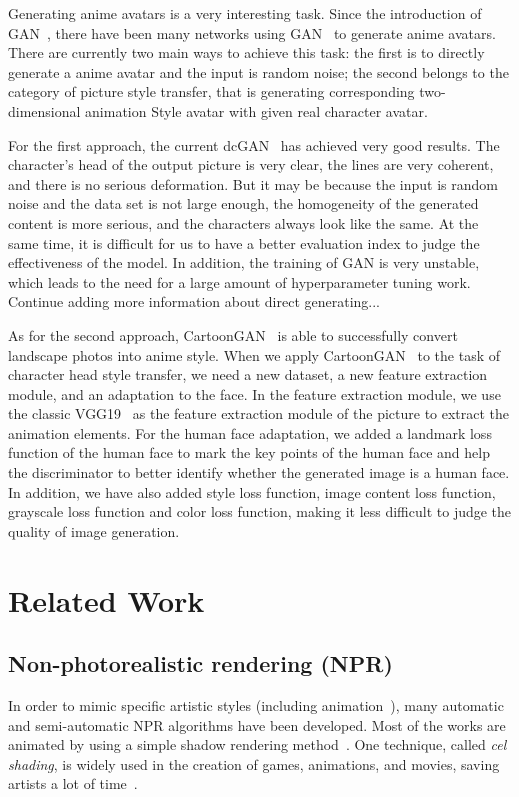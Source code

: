 \documentclass[10pt,twocolumn,letterpaper]{article}
\begin{document}
Generating anime avatars is a very interesting task. Since the introduction of GAN~\cite{GAN},
there have been many networks using GAN~\cite{GAN} to generate anime avatars. There are currently
two main ways to achieve this task: the first is to directly generate a anime avatar
and the input is random noise; the second belongs to the category of picture style
transfer, that is generating corresponding two-dimensional animation Style avatar with given real 
character avatar.

For the first approach, the current dcGAN~\cite{dcGAN} has achieved very good results. 
The character's head of the output picture is very clear, the lines are very coherent, and there 
is no serious deformation. But it may be because the input is random noise and the data 
set is not large enough, the homogeneity of the generated content is more serious, and the 
characters always look like the same. At the same time, it is difficult for us to have a better 
evaluation index to judge the effectiveness of the model. In addition, the training of GAN 
is very unstable, which leads to the need for a large amount of hyperparameter tuning work.
{\color{red}Continue adding more information about direct generating...}

As for the second approach, CartoonGAN~\cite{CartoonGAN} is able to successfully convert landscape photos 
into anime style. When we apply CartoonGAN~\cite{CartoonGAN} to the task of character head style transfer, 
we need a new dataset, a new feature extraction module, and an adaptation to the face. 
In the feature extraction module, we use the classic VGG19~\cite{VGG} as the feature extraction 
module of the picture to extract the animation elements. For the human face adaptation, 
we added a landmark loss function of the human face to mark the key points of the human face and 
help the discriminator to better identify whether the generated image is a human face. In addition, 
we have also added style loss function, image content loss function, 
grayscale loss function and color loss function, making it less difficult to 
judge the quality of image generation.

\section{Related Work}

\subsection{Non-photorealistic rendering (NPR)}
In order to mimic specific artistic styles (including animation~\cite{rosin2012image}), many automatic and 
semi-automatic NPR algorithms have been developed. Most of the works are animated by 
using a simple shadow rendering method~\cite{saito1990comprehensible}. One technique, called  \textsl{cel shading}, is widely 
used in the creation of games, animations, and movies, saving artists a lot of time~\cite{luque2012cel}.
\end{document}

